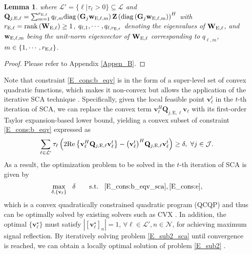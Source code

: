 \documentclass[12pt,draftclsnofoot, onecolumn]{IEEEtran}
\theoremstyle{plain}
\newtheorem{lem}{Lemma}
\begin{document}
\begin{sloppypar}
\begin{lem}
	where $\mathcal L' = \{\ell|\tau_\ell > 0\} \subseteq \mathcal L$ and $\mathbf Q_{j,\mathrm E,\ell} = \sum_{m=1}^{r_{\rm E,\ell}}q_{\ell,m}{\rm diag}\left(\mathbf G_j\mathbf w_{\rm E,\ell,m}\right)\mathbf Z\left( {\rm diag}\left(\mathbf G_j\mathbf w_{\rm E,\ell,m}\right)\right)^H$ with $r_{\rm E,\ell} = {\rm rank}\left(\mathbf W_{\mathrm E,\ell}\right) \geq 1$, $q_{\ell,1}, \cdots, q_{\ell,r_{\rm E,\ell}}$ denoting the eigenvalues of $\mathbf W_{\rm E, \ell}$, and $\mathbf w_{\rm E,\ell,m}$ being the  unit-norm eigenvector of $\mathbf W_{\rm E, \ell}$ corresponding to $q_{\ell,m}$, $m\in\{1,\cdots,r_{\rm E,\ell}\}$.   
\end{lem}
\begin{proof}
\vspace{-3mm}
Please refer to Appendix \ref{Appen_B}.
\vspace{-2mm}
\end{proof}
Note that constraint \eqref{E_cons:b_eqv} is in the form of a super-level set of convex quadratic functions, which makes it non-convex but allows the application of the iterative SCA technique \cite{2010_Dinh_SCA_converge}. Specifically, given the local feasible point $\mathbf v_{\ell}^t$ in the $t$-th iteration of SCA, we can replace the convex term $\mathbf v_{\ell}^H\mathbf Q_{j,\mathrm E, \ell}\mathbf v_{\ell}$ with its first-order Taylor expansion-based lower bound, yielding a convex subset of constraint \eqref{E_cons:b_eqv} expressed as %
{\setlength\abovedisplayskip{5pt}
\setlength\belowdisplayskip{5pt}
\begin{align}\label{E_cons:b_eqv_sca}
\sum_{\ell\in\mathcal L'}\tau_\ell\left( 2{\rm Re}\left\lbrace\mathbf v_\ell^H\mathbf Q_{j,\mathrm E,\ell}\mathbf v_\ell^t\right\rbrace - \big(\mathbf v_\ell^t\big)^H\mathbf Q_{j,\mathrm E,\ell}\mathbf v_\ell^t\right) \geq \delta, \ \forall j\in\mathcal J. 
\end{align}}%
As a result, the optimization problem to be solved in the $t$-th iteration of SCA is given by%
{\setlength\abovedisplayskip{5pt}
\setlength\belowdisplayskip{5pt} 
\begin{align}\label{E_sub2_sca}
\underset{\delta,\{\mathbf v_\ell\}}{\max} \hspace{3mm} \delta \hspace{7mm}
\text{s.t.} \hspace{3mm}\eqref{E_cons:b_eqv_sca}, \eqref{E_cons:e},
\end{align}}%
which is a convex quadratically constrained quadratic program (QCQP) and thus can be optimally solved by existing solvers such as CVX \cite{2004_S.Boyd_cvx}. In addition, the optimal $\{\mathbf v_\ell^\star\}$ must satisfy $\left| \left[\mathbf v_\ell^\star\right]_n\right| = 1$, $\forall \ell\in\mathcal L', n\in\mathcal N$, for achieving maximum signal reflection. By iteratively solving problem \eqref{E_sub2_sca}  until convergence is reached, we can obtain a locally optimal solution of problem \eqref{E_sub2} \cite{2010_Dinh_SCA_converge}. 


\end{sloppypar}
\end{document}
